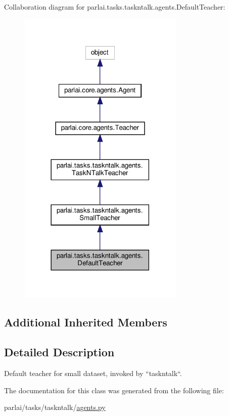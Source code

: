 Collaboration diagram for parlai.\+tasks.\+taskntalk.\+agents.\+Default\+Teacher\+:
\nopagebreak
\begin{figure}[H]
\begin{center}
\leavevmode
\includegraphics[width=225pt]{classparlai_1_1tasks_1_1taskntalk_1_1agents_1_1DefaultTeacher__coll__graph}
\end{center}
\end{figure}
\subsection*{Additional Inherited Members}


\subsection{Detailed Description}
\begin{DoxyVerb}Default teacher for small dataset, invoked by ``taskntalk``.
\end{DoxyVerb}
 

The documentation for this class was generated from the following file\+:\begin{DoxyCompactItemize}
\item 
parlai/tasks/taskntalk/\hyperlink{parlai_2tasks_2taskntalk_2agents_8py}{agents.\+py}\end{DoxyCompactItemize}
